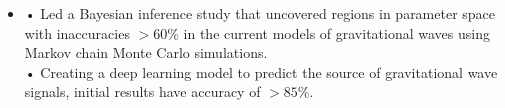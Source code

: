 \documentclass[11pt,a4paper,sans]{moderncv}       %
\begin{document}
\begin{itemize}

\item{
{\vspace{4pt}
• Led a Bayesian inference study %
that uncovered regions in parameter space with inaccuracies $>60\%$  in the current models of gravitational waves using Markov chain Monte Carlo simulations. 
\vspace{4pt}\\
• Creating a deep learning model to predict the source of gravitational wave signals, initial results have accuracy of $>85\%$. }
}
\vspace{8pt}



\end{itemize}
\end{document}
